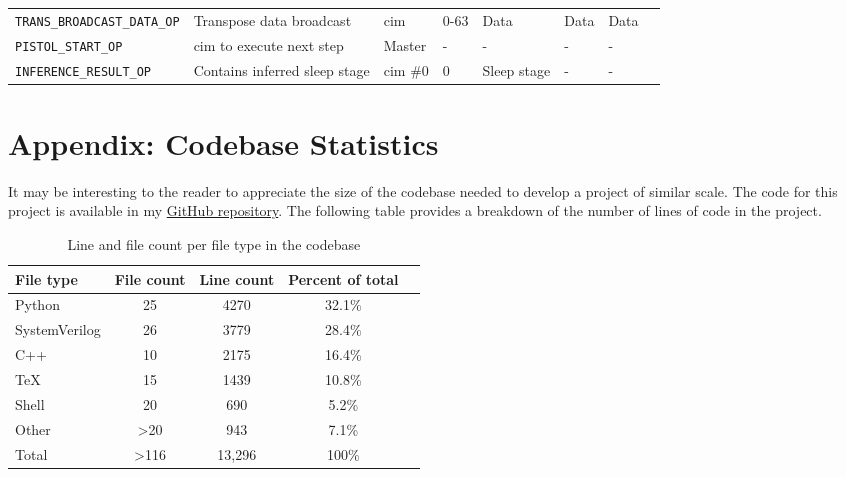 \begin{sidewaystable}
\begin{tabular}{@{} p{6.5cm}lllllll @{}}
        \texttt{TRANS\_BROADCAST\_DATA\_OP}         & Transpose data broadcast          & \ac{cim}      & 0-63          & Data              & Data              & Data \\
        \texttt{PISTOL\_START\_OP}                  & \ac{cim} to execute next step     & Master        & -             & -                 & -                 & - \\
        \texttt{INFERENCE\_RESULT\_OP}              & Contains inferred sleep stage     & \ac{cim} \#0  & 0             & Sleep stage       & -                 & - \\
    \end{tabular}
    \label{tab:bus_ops}
\end{sidewaystable}

\section{Appendix: Codebase Statistics}
It may be interesting to the reader to appreciate the size of the codebase needed to develop a project of similar scale. The code for this project is available 
in my \href{https://github.com/TristanRobitaille/engsci-thesis}{GitHub repository}. The following table provides a breakdown of the number of lines of code in the project.

\begin{table}
    \centering
    \renewcommand{\arraystretch}{1.2} %
    \setlength{\arrayrulewidth}{1.5pt} %
    \caption{Line and file count per file type in the codebase}
    \begin{tabular}{@{} p{4cm}cccr @{}}
        \toprule
        File type       & File count    & Line count    & Percent of total & \\\midrule
        Python          & 25            & 4270          & 32.1\% \\
        SystemVerilog   & 26            & 3779          & 28.4\% \\
        C++             & 10            & 2175          & 16.4\% \\
        TeX             & 15            & 1439          & 10.8\%  \\
        Shell           & 20            & 690           & 5.2\%  \\
        Other           & >20           & 943           & 7.1\%  \\\midrule
        Total           & >116          & 13,296        & 100\%  \\
        \hline
    \end{tabular}
    \label{tab:line_cnt}
\end{table}

